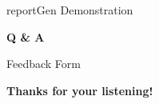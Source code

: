 \documentclass[handout, 12pt]{beamer}
\begin{document}
	\begin{frame}{reportGen Demonstration}
		\begin{figure}[H]
			\centering
			
		\end{figure}
	\end{frame}

	\begin{frame}[focus]
		\centering
		{\fontsize{30pt}{60pt}\selectfont \textbf{Q \& A}}
	  \end{frame}	  

	\begin{frame}{Feedback Form}
		\begin{figure}[H]
			\centering
			
		\end{figure}
	\end{frame}

	\begin{frame}[focus]
        \textbf{Thanks for your listening!}\\
		\vspace{10pt}
		\href{https://www.facebook.com/yueswater/}{}  \hspace{10pt} \href{https://github.com/xiaolong70701/reportGen}{} \hspace{10pt} \href{https://www.instagram.com/yues_19_water/}{}
    \end{frame}
\end{document}
